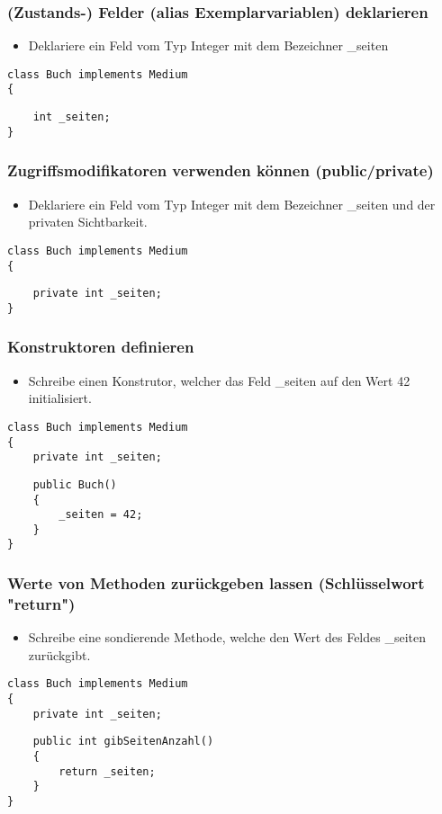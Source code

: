 \documentclass[mathserif]{beamer}
\begin{document}
\begin{frame}[fragile]
\frametitle{(Zustands-) Felder (alias Exemplarvariablen) deklarieren}
\begin{itemize}
    \item Deklariere ein Feld vom Typ Integer mit dem Bezeichner \_seiten
\end{itemize}
    \begin{lstlisting}
class Buch implements Medium 
{
    \end{lstlisting}
\pause
    \begin{lstlisting}
    int _seiten;
}
    \end{lstlisting}
\end{frame}

\begin{frame}[fragile]
\frametitle{Zugriffsmodifikatoren verwenden k\"onnen (public/private)}
\begin{itemize}
\item Deklariere ein Feld vom Typ Integer mit dem Bezeichner \_seiten und der privaten Sichtbarkeit.
\end{itemize}
    \begin{lstlisting}
class Buch implements Medium 
{
    \end{lstlisting}
\pause
    \begin{lstlisting}
    private int _seiten;
}
    \end{lstlisting}
\end{frame}

\begin{frame}[fragile]
\frametitle{Konstruktoren definieren}
\begin{itemize}
    \item Schreibe einen Konstrutor, welcher das Feld \_seiten auf den Wert 42 initialisiert.
\end{itemize}
    \begin{lstlisting}
class Buch implements Medium 
{
    private int _seiten;
    \end{lstlisting}
\pause
    \begin{lstlisting}
    public Buch()
    {
        _seiten = 42;
    }
}
    \end{lstlisting}
\end{frame}

\begin{frame}[fragile]
\frametitle{Werte von Methoden zurückgeben lassen (Schlüsselwort "return")}
\begin{itemize}
    \item Schreibe eine sondierende Methode, welche den Wert des Feldes \_seiten zur\"uckgibt.
\end{itemize}
    \begin{lstlisting}
class Buch implements Medium 
{
    private int _seiten;
    \end{lstlisting}
\pause
    \begin{lstlisting}
    public int gibSeitenAnzahl()
    {
        return _seiten;
    }
}
    \end{lstlisting}
\end{frame}
\end{document}
